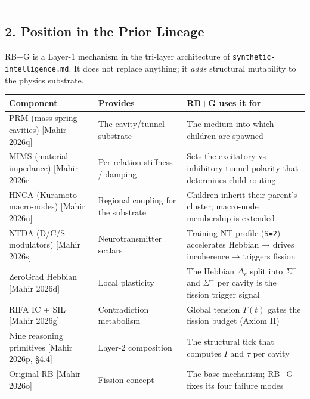 \documentclass[
  11pt,
  a4paper,
]{article}
\begin{document}
\begin{center}\rule{0.5\linewidth}{0.5pt}\end{center}

\subsection{2. Position in the Prior
Lineage}\label{position-in-the-prior-lineage}

RB+G is a Layer-1 mechanism in the tri-layer architecture of
\texttt{synthetic-intelligence.md}. It does not replace anything; it
\emph{adds} structural mutability to the physics substrate.

\begin{longtable}[]{@{}
  >{\raggedright\arraybackslash}p{}
  >{\raggedright\arraybackslash}p{}
  >{\raggedright\arraybackslash}p{}@{}}
\toprule\noalign{}
\begin{minipage}[b]{\linewidth}\raggedright
Component
\end{minipage} & \begin{minipage}[b]{\linewidth}\raggedright
Provides
\end{minipage} & \begin{minipage}[b]{\linewidth}\raggedright
RB+G uses it for
\end{minipage} \\
\midrule\noalign{}
\endhead
\bottomrule\noalign{}
\endlastfoot
PRM (mass-spring cavities) {[}Mahir 2026q{]} & The cavity/tunnel
substrate & The medium into which children are spawned \\
MIMS (material impedance) {[}Mahir 2026r{]} & Per-relation stiffness /
damping & Sets the excitatory-vs-inhibitory tunnel polarity that
determines child routing \\
HNCA (Kuramoto macro-nodes) {[}Mahir 2026n{]} & Regional coupling for
the substrate & Children inherit their parent's cluster; macro-node
membership is extended \\
NTDA (D/C/S modulators) {[}Mahir 2026s{]} & Neurotransmitter scalars &
Training NT profile (\texttt{S=2}) accelerates Hebbian → drives
incoherence → triggers fission \\
ZeroGrad Hebbian {[}Mahir 2026d{]} & Local plasticity & The Hebbian
\(\Delta_e\) split into \(\Sigma^+\) and \(\Sigma^-\) per cavity is the
fission trigger signal \\
RIFA IC + SIL {[}Mahir 2026g{]} & Contradiction metabolism & Global
tension \(T(t)\) gates the fission budget (Axiom II) \\
Nine reasoning primitives {[}Mahir 2026p, §4.4{]} & Layer-2 composition
& The structural tick that computes \(I\) and \(\tau\) per cavity \\
Original RB {[}Mahir 2026o{]} & Fission concept & The base mechanism;
RB+G fixes its four failure modes \\
\end{longtable}
\end{document}
